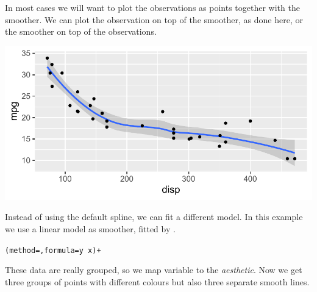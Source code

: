 \documentclass[krantz2]{krantz}\usepackage{knitr}
\begin{document}
In most cases we will want to plot the observations as points together with the smoother. We can plot the observation on top of the smoother, as done here, or the smoother on top of the observations.

\begin{knitrout}\footnotesize
{}\color{fgcolor}\begin{kframe}
\begin{alltt}
\hlstd{(}  \hlstd{(}    \hlopt{+}
  \hlstd{(}  \hlopt{~}  \hlopt{+}
  \hlstd{()}
\end{alltt}


{\ttfamily\noindent\itshape\color{messagecolor}{\#\# `geom\_smooth()` using method = 'loess'}}\end{kframe}

{\centering \includegraphics[width=.7\textwidth]{figure/pos-smooth-plot-02-1}

}



\end{knitrout}

Instead of using the default spline, we can fit a different model. In this example we use a linear model as smoother, fitted by .

\begin{knitrout}\footnotesize
{}\color{fgcolor}\begin{kframe}
\begin{alltt}
  (method = , formula = y ~ x) +
\end{alltt}
\end{kframe}
\end{knitrout}

These data are really grouped, so we map variable  to the  \emph{aesthetic}. Now we get three groups of points with different colours but also three separate smooth lines.
\end{document}
